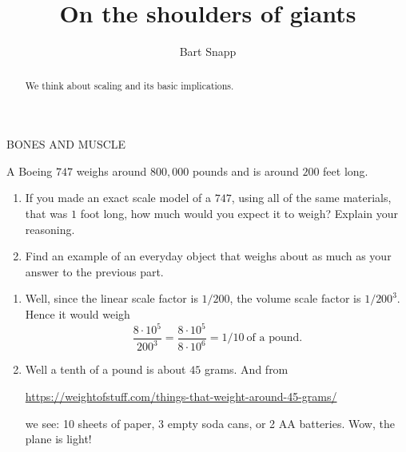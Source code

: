 \documentclass[handout,nooutcomes,noauthor,hints]{ximera}
\title{On the shoulders of giants}
\author{Bart Snapp}
\begin{document}
\begin{abstract}
  We think about scaling and its basic implications.
\end{abstract}
\maketitle

\begin{listOutcomes}
\item 
\item 
\item 
\item 
\end{listOutcomes}

\mynewpage
\begin{question}
  BONES AND MUSCLE
\end{question}
\mynewpage


\begin{question}
  A Boeing $747$ weighs around $800,000$ pounds and is around $200$
  feet long.
  \begin{enumerate}
    \item If you made an exact scale model of a $747$, using all of
      the same materials, that was $1$ foot long, how much would you
      expect it to weigh? Explain your reasoning.
    \item Find an example of an everyday object that weighs about as
      much as your answer to the previous part.
  \end{enumerate}
      \begin{freeResponse}
        \begin{enumerate}
          \item Well, since the linear scale factor is $1/200$, the volume scale
          factor is $1/200^3$. Hence it would weigh
          \[
          \frac{8\cdot10^5}{200^3} =\frac{8\cdot10^5}{8\cdot 10^6}=1/10~\text{of a pound.}
          \]
        \item Well a tenth of a pound is about $45$ grams. And from
          \begin{center}
          \url{https://weightofstuff.com/things-that-weight-around-45-grams/}
          \end{center}
          we see: 10 sheets of paper, 3 empty soda cans, or 2 AA
          batteries. Wow, the plane is light!
        \end{enumerate}
        \end{freeResponse}
\end{question}
\mynewpage
\end{document}
